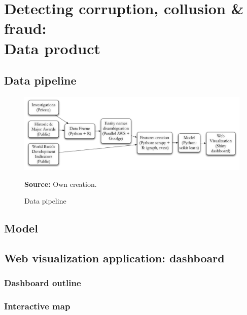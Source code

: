 \chapter{Detecting corruption, collusion \& fraud:\\ Data product}\label{chap_prod}

\section{Data pipeline}
\begin{figure}[H]
\begin{center}
\caption{Data pipeline}
\label{fig_pipeline}
\includegraphics[width=\textwidth,height=1\textheight,keepaspectratio]{../img/pipeline.pdf}
\end{center}
\noindent \footnotesize{\textbf{Source:} Own creation.}
\end{figure}

\section{Model}

\section{Web visualization application: dashboard}

\subsection{Dashboard outline}

\subsection{Interactive map}

